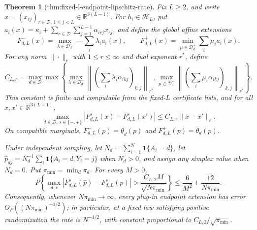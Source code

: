\documentclass{article}
\newtheorem{theorem}{Theorem}
\begin{document}
\begin{theorem}[thm:fixed-l-endpoint-lipschitz-rate]\label{thm:fixed-l-endpoint-lipschitz-rate}
Fix \(L\ge2\), and write \(x=(x_{rj})_{r\in\mathcal D,\,1\le j<L}\in\mathbb R^{3(L-1)}\).  For \(h_i\in\mathcal H_L\), put \(a_i(x)=\kappa_i+\sum_{r\in\mathcal D}\sum_{j=1}^{L-1}\alpha_{irj}x_{rj}\), and define the global affine extensions
\[
 F_{d,L}^-(x)=\max_{\lambda\in\mathcal D_d^-}-\sum_i\lambda_i a_i(x),
 \qquad
 F_{d,L}^+(x)=\min_{\mu\in\mathcal D_d^+}\sum_i\mu_i a_i(x).
\]
For any norm \(\|\cdot\|_r\) with \(1\le r\le\infty\) and dual exponent \(r^*\), define
\[
 C_{L,r}=\max_{d\in\mathcal D}\max\left\{
 \max_{\lambda\in\mathcal D_d^-}
 \left\|\left(\sum_i\lambda_i\alpha_{ikj}\right)_{k,j}\right\|_{r^*},
 \max_{\mu\in\mathcal D_d^+}
 \left\|\left(\sum_i\mu_i\alpha_{ikj}\right)_{k,j}\right\|_{r^*}
 \right\}.
\]
This constant is finite and computable from the fixed-\(L\) certificate lists, and for all \(x,x'\in\mathbb R^{3(L-1)}\),
\[
 \max_{d\in\mathcal D,\,s\in\{-,+\}}
 |F_{d,L}^s(x)-F_{d,L}^s(x')|\le C_{L,r}\|x-x'\|_r.
\]
On compatible marginals, \(F_{d,L}^-(p)=\underline\theta_d(p)\) and \(F_{d,L}^+(p)=\overline\theta_d(p)\).

Under independent sampling, let \(N_d=\sum_{i=1}^N\mathbf 1\{A_i=d\}\), let \(\widehat p_{dj}=N_d^{-1}\sum_i\mathbf 1\{A_i=d,Y_i=j\}\) when \(N_d>0\), and assign any simplex value when \(N_d=0\).  Put \(\pi_{\min}=\min_d\pi_d\).  For every \(M>0\),
\[
 P\left\{
 \max_{d,s}|F_{d,L}^s(\widehat p)-F_{d,L}^s(p)|>
 \frac{C_{L,2}M}{\sqrt{N\pi_{\min}}}
 \right\}
 \le \frac{6}{M^2}+\frac{12}{N\pi_{\min}}.
\]
Consequently, whenever \(N\pi_{\min}\to\infty\), every plug-in endpoint extension has error \(O_P((N\pi_{\min})^{-1/2})\); in particular, at a fixed law satisfying positive randomization the rate is \(N^{-1/2}\), with constant proportional to \(C_{L,2}/\sqrt{\pi_{\min}}\).
\end{theorem}
\end{document}
